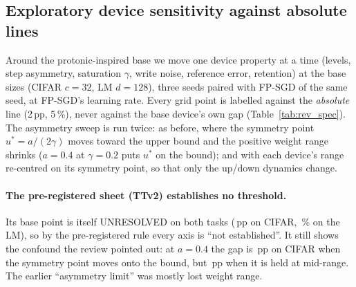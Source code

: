 \subsection{Exploratory device sensitivity against absolute lines}\label{sec:spec}

Around the protonic-inspired base we move one device property at a time (levels, step asymmetry, saturation $\gamma$, write
noise, reference error, retention) at the base sizes (CIFAR $c=32$, LM $d=128$), three seeds paired with FP-SGD of the same seed,
at FP-SGD's learning rate. Every grid point is labelled against the \emph{absolute} line (2\,pp, 5\,\%), never against the base
device's own gap (Table~\ref{tab:rev_spec}). The asymmetry sweep is run twice: as before, where the symmetry point
$u^*=a/(2\gamma)$ moves toward the upper bound and the positive weight range shrinks ($a=0.4$ at $\gamma=0.2$ puts $u^*$ on the
bound); and with each device's range re-centred on its symmetry point, so that only the up/down dynamics change.

\paragraph{The pre-registered sheet (TTv2) establishes no threshold.} Its base point is itself UNRESOLVED on both tasks
(\RVSpecTtvTwoCifarBaseGap\,pp on CIFAR, \RVSpecTtvTwoLmBaseGap\,\% on the LM), so by the pre-registered rule every axis is ``not
established''. It still shows the confound the review pointed out: at $a=0.4$ the gap is \RVSpecTtvTwoCifarAsymAtZeroPFourGap\,pp
on CIFAR when the symmetry point moves onto the bound, but \RVSpecTtvTwoCifarAsymFixedspAtZeroPFourGap\,pp when it is held at
mid-range. The earlier ``asymmetry limit'' was mostly lost weight range.

